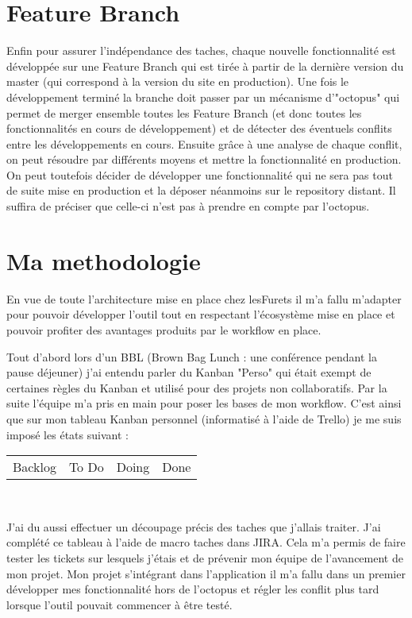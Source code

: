 \section{Feature Branch}
Enfin pour assurer l'indépendance des taches, chaque nouvelle fonctionnalité est développée sur une Feature Branch qui est tirée à partir de la dernière version du master (qui correspond à la version du site en production). Une fois le développement terminé la branche doit passer par un mécanisme d'"octopus" qui permet de merger ensemble toutes les Feature Branch (et donc toutes les fonctionnalités en cours de développement) et de détecter des éventuels conflits entre les développements en cours. Ensuite grâce à une analyse de chaque conflit, on peut résoudre par différents moyens et mettre la fonctionnalité en production. On peut toutefois décider de développer une fonctionnalité qui ne sera pas tout de suite mise en production et la déposer néanmoins sur le repository distant. Il suffira de préciser que celle-ci n'est pas à prendre en compte par l'octopus.

\section{Ma methodologie}
En vue de toute l'architecture mise en place chez lesFurets il m'a fallu m'adapter pour pouvoir développer l'outil tout en respectant l'écosystème mise en place et pouvoir profiter des avantages produits par le workflow en place.

Tout d'abord lors d'un BBL (Brown Bag Lunch : une conférence pendant la pause déjeuner) j'ai entendu parler du Kanban "Perso" qui était exempt de certaines règles du Kanban et utilisé pour des projets non collaboratifs. Par la suite l'équipe m'a pris en main pour poser les bases de mon workflow. 
C'est ainsi que sur mon tableau Kanban personnel (informatisé à l'aide de Trello) je me suis imposé les états suivant : \\
\begin{center}
\begin{tabular}{|c|c|c|c|}
\hline
 Backlog & To Do & Doing & Done\\
\end{tabular} \\
\end{center}
J'ai du aussi effectuer un découpage précis des taches que j'allais traiter. J'ai complété ce tableau à l'aide de macro taches dans JIRA. Cela m'a permis de faire tester les tickets sur lesquels j'étais et de prévenir mon équipe de l'avancement de mon projet. Mon projet s'intégrant dans l'application il m'a fallu dans un premier développer mes fonctionnalité hors de l'octopus et régler les conflit plus tard lorsque l'outil pouvait commencer à être testé.